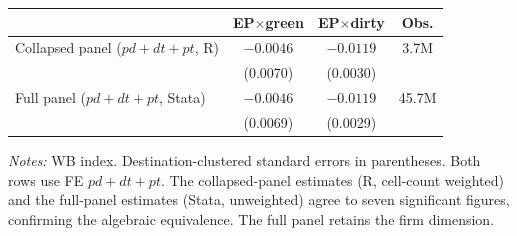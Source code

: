 \small
\begin{threeparttable}
\begin{tabular}{lccc}
\toprule
 & EP$\times$green & EP$\times$dirty & Obs. \\
\midrule
Collapsed panel ($pd+dt+pt$, R) & $-0.0046$ & $-0.0119$ & 3.7M \\
& (0.0070) & (0.0030) & \\
Full panel ($pd+dt+pt$, Stata) & $-0.0046$ & $-0.0119$ & 45.7M \\
& (0.0069) & (0.0029) & \\
\bottomrule
\end{tabular}
\begin{tablenotes}\footnotesize
\item \emph{Notes:} WB index. Destination-clustered standard errors in parentheses. Both rows
use FE $pd+dt+pt$. The collapsed-panel estimates (R, cell-count weighted) and the
full-panel estimates (Stata, unweighted) agree to seven significant figures,
confirming the algebraic equivalence. The full panel retains the firm dimension.
\end{tablenotes}
\end{threeparttable}
